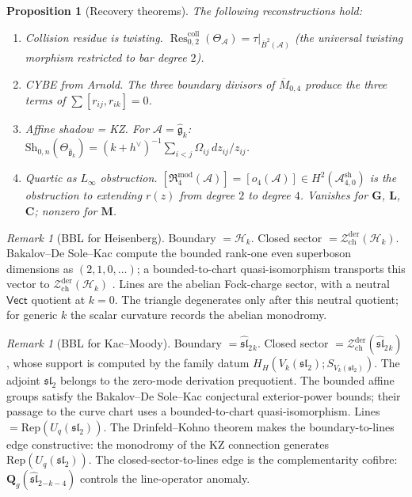 \documentclass[11pt,reqno]{amsart}
\newtheorem{proposition}[theorem]{Proposition}
\theoremstyle{definition}
\theoremstyle{remark}
\newtheorem{remark}[theorem]{Remark}
\newcommand{\cA}{\mathcal{A}}
\newcommand{\cH}{\mathcal{H}}
\newcommand{\cZ}{\mathcal{Z}}
\newcommand{\Rep}{\mathrm{Rep}}
\newcommand{\Sh}{\mathrm{Sh}}
\newcommand{\barB}{\bar{B}}
\newcommand{\fg}{\mathfrak{g}}
\newcommand{\fsl}{\mathfrak{sl}}
\DeclareMathOperator{\Res}{Res}
\DeclareMathOperator{\coll}{coll}
\numberwithin{equation}{section}
\begin{document}
\begin{proposition}[Recovery theorems]\label{prop:recovery}
The following reconstructions hold:
\begin{enumerate}[label=\textup{(R\arabic*)},nosep]
\item \emph{Collision residue is twisting.}
  $\Res^{\coll}_{0,2}(\Theta_{\cA}) = \tau|_{\barB^2(\cA)}$
  (the universal twisting morphism restricted to bar degree $2$).
\item \emph{CYBE from Arnold.}
  The three boundary divisors of $\overline{M}_{0,4}$ produce the
  three terms of $\sum [r_{ij}, r_{ik}] = 0$.
\item \emph{Affine shadow = KZ.}
  For $\cA = \widehat{\fg}_k$:
  $\Sh_{0,n}(\Theta_{\widehat{\fg}_k})
  = (k + h^\vee)^{-1} \sum_{i<j}
  \Omega_{ij}\,dz_{ij}/z_{ij}$.
\item \emph{Quartic as $L_\infty$ obstruction.}
  $[\mathfrak{R}^{\mathrm{mod}}_4(\cA)]
  = [o_4(\cA)] \in
  H^2(\cA^{\mathrm{sh}}_{4,0})$ is the obstruction to extending
  $r(z)$ from degree $2$ to degree $4$. Vanishes for
  $\mathbf{G}$, $\mathbf{L}$, $\mathbf{C}$; nonzero for
  $\mathbf{M}$.
\end{enumerate}
\end{proposition}

\begin{remark}[BBL for Heisenberg]\label{rem:bbl-heis}
Boundary $= \cH_k$. Closed sector
$= \cZ^{\mathrm{der}}_{\mathrm{ch}}(\cH_k)$.  Bakalov--De
Sole--Kac compute the bounded rank-one even superboson dimensions as
$(2,1,0,\ldots)$; a bounded-to-chart quasi-isomorphism transports
this vector to $\cZ^{\mathrm{der}}_{\mathrm{ch}}(\cH_k)$
\cite[Theorem~7.4]{BDSK21}. Lines
are the abelian Fock-charge sector, with a neutral \(\mathsf{Vect}\)
quotient at \(k=0\). The triangle degenerates only after this neutral
quotient; for generic \(k\) the scalar curvature records the abelian
monodromy.
\end{remark}

\begin{remark}[BBL for Kac--Moody]\label{rem:bbl-km}
Boundary $= \widehat{\fsl}_2{}_k$. Closed sector
$= \cZ^{\mathrm{der}}_{\mathrm{ch}}(\widehat{\fsl}_2{}_k)$, whose
support is computed by the family datum
$H_H(V_k(\fsl_2);S_{V_k(\fsl_2)})$.  The adjoint
$\fsl_2$ belongs to the zero-mode derivation prequotient.  The
bounded affine groups satisfy the Bakalov--De Sole--Kac conjectural
exterior-power bounds; their passage to the curve chart uses a
bounded-to-chart quasi-isomorphism. Lines $= \Rep(U_q(\fsl_2))$. The
Drinfeld--Kohno theorem makes the boundary-to-lines edge
constructive: the monodromy of the KZ connection generates
$\Rep(U_q(\fsl_2))$. The closed-sector-to-lines edge is the
complementarity cofibre:
$\mathbf{Q}_g(\widehat{\fsl}_2{}_{-k-4})$ controls the line-operator
anomaly.
\end{remark}
\end{document}
